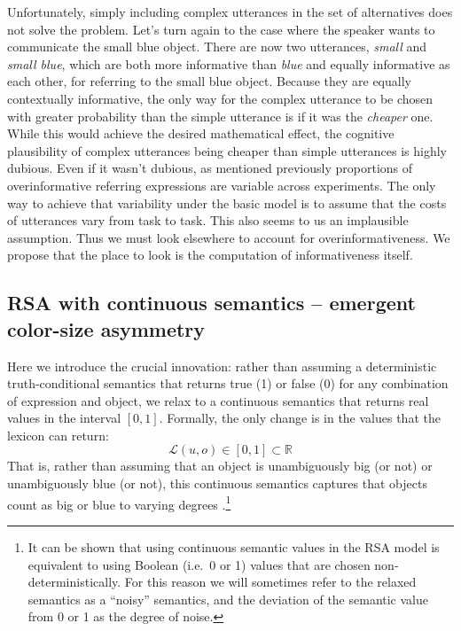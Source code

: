 \documentclass[11pt]{article}
\begin{document}
Unfortunately, simply including complex utterances in the set of alternatives does not solve the problem. Let's turn again to the case where the speaker wants to communicate the small blue object. There are now two  utterances, \emph{small} and \emph{small blue}, which are both more informative than \emph{blue} and equally informative as each other, for referring to the small blue object. Because they are equally contextually informative, the only way for the complex utterance to be chosen with greater probability than the simple utterance is if it was the \emph{cheaper} one. While this would achieve the desired mathematical effect, the cognitive plausibility of complex utterances being cheaper than simple utterances is highly dubious. Even if it wasn't dubious, as  mentioned previously proportions of overinformative referring expressions are variable across experiments. The only way to achieve that variability under the basic model is to assume that the costs of utterances vary from task to task. This also seems to us an implausible assumption. Thus we must look elsewhere to account for overinformativeness. We propose that the place to look is the computation of informativeness itself. 



\subsection{RSA with continuous semantics -- emergent color-size asymmetry}
\label{sec:modifiedmodel}

Here we introduce the crucial innovation: rather than assuming a deterministic truth-conditional semantics that returns true (1) or false (0) for any combination of expression and object, we relax to a continuous semantics that returns real values in the interval $[0,1]$. 
Formally, the only change is in the values that the lexicon can return:
\begin{equation}
\mathcal{L}(u,o) \in [0, 1] \subset \mathbb{R}
\end{equation}
That is, rather than assuming that an object is unambiguously big (or not) or unambiguously blue (or not), this continuous semantics captures that objects count as big or blue to  varying degrees \cite<similar to approaches in fuzzy logic and prototype theory,>{zadeh1965fuzzy, Rosch1973}.\footnote{It can be shown that using continuous semantic values in the RSA model is equivalent to using Boolean (i.e.~0 or 1) values that are chosen non-deterministically. For this reason we will sometimes refer to the relaxed semantics as a ``noisy'' semantics, and the deviation of the semantic value from 0 or 1 as the degree of noise.}
\end{document}
